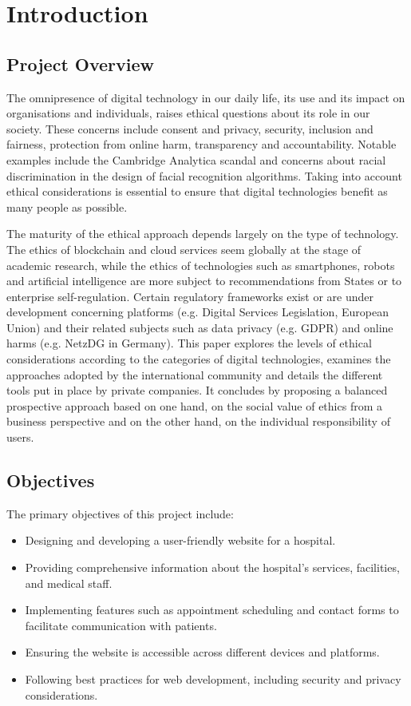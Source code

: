 \documentclass{article}
\begin{document}
\section{Introduction} \label{sec:introduction}
\subsection{Project Overview}
The omnipresence of digital technology in our daily life, its use and its impact on organisations and individuals, raises ethical questions about its role in our society. These concerns include consent and privacy, security, inclusion and fairness, protection from online harm, transparency and accountability. Notable examples include the Cambridge Analytica scandal and concerns about racial discrimination in the design of facial recognition algorithms. Taking into account ethical considerations is essential to ensure that digital technologies benefit as many people as possible.

The maturity of the ethical approach depends largely on the type of technology. The ethics of blockchain and cloud services seem globally at the stage of academic research, while the ethics of technologies such as smartphones, robots and artificial intelligence are more subject to recommendations from States or to enterprise self-regulation. Certain regulatory frameworks exist or are under development concerning platforms (e.g. Digital Services Legislation, European Union) and their related subjects such as data privacy (e.g. GDPR) and online harms (e.g. NetzDG in Germany).
This paper explores the levels of ethical considerations according to the categories of digital technologies, examines the approaches adopted by the international community and details the different tools put in place by private companies. It concludes by proposing a balanced prospective approach based on one hand, on the social value of ethics from a business perspective and on the other hand, on the individual responsibility of users.

\subsection{Objectives}
The primary objectives of this project include:
\begin{itemize}
    \item Designing and developing a user-friendly website for a hospital.
    \item Providing comprehensive information about the hospital's services, facilities, and medical staff.
    \item Implementing features such as appointment scheduling and contact forms to facilitate communication with patients.
    \item Ensuring the website is accessible across different devices and platforms.
    \item Following best practices for web development, including security and privacy considerations.
\end{itemize}
\end{document}
